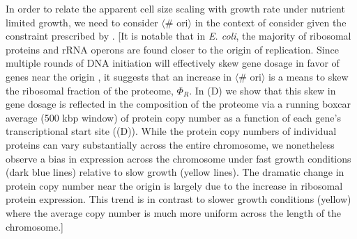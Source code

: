 

In order to relate the apparent cell size scaling with growth rate under
nutrient limited growth, we need to consider $\langle$\# ori$\rangle$ in the
context of consider given the constraint prescribed by
.
[It is notable that in \textit{E. coli}, the
majority of ribosomal proteins and rRNA operons are found closer to the origin
of replication. Since multiple rounds of DNA initiation will effectively skew
gene dosage in favor of genes near the origin \citep{scholz2019}, it suggests
that an increase in  $\langle$\# ori$\rangle$ is a means to skew the ribosomal
fraction of the proteome, $\Phi_R$. In (D) we show
that this skew in gene dosage is reflected in the composition of the proteome
via a running boxcar average (500 kbp window) of protein copy number as a
function of each gene's transcriptional start site
((D)). While the protein copy numbers of individual
proteins can vary substantially across the entire chromosome, we nonetheless
observe a bias in expression across the chromosome under fast growth conditions
(dark blue lines) relative to slow growth (yellow lines). The dramatic change in
protein copy number near the origin is largely due to the increase in ribosomal
protein expression. This trend is in contrast to slower growth conditions
(yellow) where the average copy number is much more uniform across the length of
the chromosome.]


